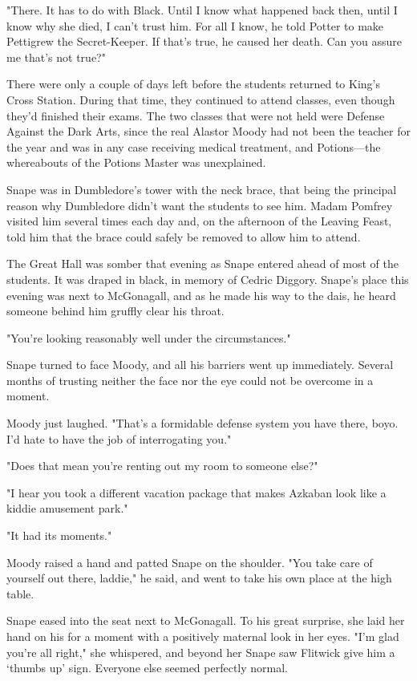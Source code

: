"There. It has to do with Black. Until I know what happened back then, until I know why she died, I can't trust him. For all I know, he told Potter to make Pettigrew the Secret-Keeper. If that's true, he caused her death. Can you assure me that's not true?"

\sbreak

There were only a couple of days left before the students returned to King's Cross Station. During that time, they continued to attend classes, even though they'd finished their exams. The two classes that were not held were Defense Against the Dark Arts, since the real Alastor Moody had not been the teacher for the year and was in any case receiving medical treatment, and Potions—the whereabouts of the Potions Master was unexplained.

Snape was in Dumbledore's tower with the neck brace, that being the principal reason why Dumbledore didn't want the students to see him. Madam Pomfrey visited him several times each day and, on the afternoon of the Leaving Feast, told him that the brace could safely be removed to allow him to attend.

The Great Hall was somber that evening as Snape entered ahead of most of the students. It was draped in black, in memory of Cedric Diggory. Snape's place this evening was next to McGonagall, and as he made his way to the dais, he heard someone behind him gruffly clear his throat.

"You're looking reasonably well under the circumstances."

Snape turned to face Moody, and all his barriers went up immediately. Several months of trusting neither the face nor the eye could not be overcome in a moment.

Moody just laughed. "That's a formidable defense system you have there, boyo. I'd hate to have the job of interrogating you."

"Does that mean you're renting out my room to someone else?"

"I hear you took a different vacation package that makes Azkaban look like a kiddie amusement park."

"It had its moments."

Moody raised a hand and patted Snape on the shoulder. "You take care of yourself out there, laddie," he said, and went to take his own place at the high table.

Snape eased into the seat next to McGonagall. To his great surprise, she laid her hand on his for a moment with a positively maternal look in her eyes. "I'm glad you're all right," she whispered, and beyond her Snape saw Flitwick give him a `thumbs up' sign. Everyone else seemed perfectly normal.

